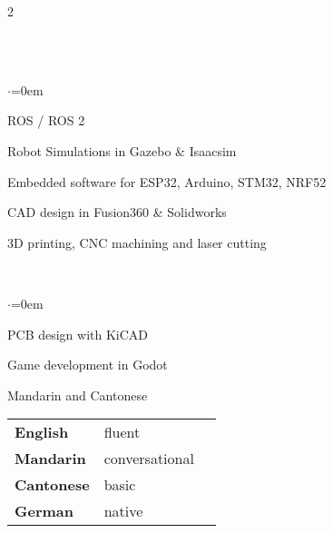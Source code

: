 \documentclass[grey]{hipstercv}
\newlength{\leftcolwidth}
\begin{document}
\begin{paracol}{2}
{\bigskip

 \\

 \\
\begin{list}{$\cdot$}{\leftmargin=0em}\setlength{\itemsep}{-0.3em} \vspace{-0.5em}
    \item ROS / ROS 2
    \item Robot Simulations in Gazebo \& Isaacsim
    \item Embedded software for ESP32, Arduino, STM32, NRF52 
    \item CAD design in Fusion360 \& Solidworks
    \item 3D printing, CNC machining and laser cutting 
\end{list}
\bigskip


 \\

\begin{list}{$\cdot$}{\leftmargin=0em}\setlength{\itemsep}{-0.3em} \vspace{-0.5em}
    \item PCB design with KiCAD 
    \item Game development in Godot 
    \item Mandarin and Cantonese
\end{list}

\bigskip

\bigskip


\begin{minipage}[t]{\leftcolwidth}
\begin{tabular}{l | ll}
\textbf{English} & {\phantom{x}\footnotesize fluent} \\
\textbf{Mandarin} & {\phantom{x}\footnotesize conversational} \\
\textbf{Cantonese} & {\phantom{x}\footnotesize basic} \\
\textbf{German} & {\phantom{x}\footnotesize native} \\
\end{tabular}
\end{minipage}

\bigskip


}
\end{paracol}
\end{document}
